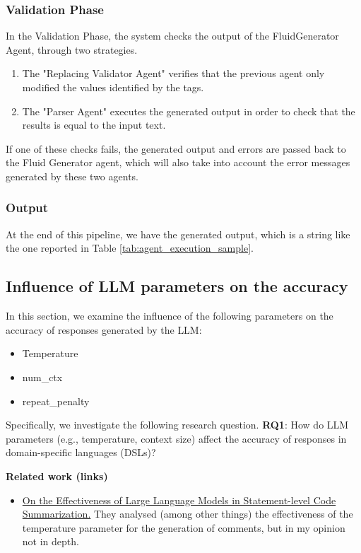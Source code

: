 \subsubsection{Validation Phase}
In the Validation Phase, the system checks the output of the FluidGenerator Agent, through two strategies.
\begin{enumerate}
    \item The "Replacing Validator Agent" verifies that the previous agent only modified the values identified by the tags.
    \item The "Parser Agent" executes the generated output in order to check that the results is equal to the input text.
\end{enumerate}

If one of these checks fails, the generated output and errors are passed back to the Fluid Generator agent, which will also take into account the error messages generated by these two agents.

\subsubsection{Output}

At the end of this pipeline, we have the generated output, which is a string like the one reported in Table \ref{tab:agent_execution_sample}.

\subsection{Influence of LLM parameters on the accuracy}
In this section, we examine the influence of the following parameters on the accuracy of responses generated by the LLM:

\begin{itemize}
    \item Temperature
    \item num\_ctx
    \item repeat\_penalty
\end{itemize}

Specifically, we investigate the following research question. \textbf{RQ1}: How do LLM parameters (e.g., temperature, context size) affect the accuracy of responses in domain-specific languages (DSLs)?

\textbf{Related work (links)}
\begin{itemize}
    \item \href{https://ieeexplore.ieee.org/document/10684656}{On the Effectiveness of Large Language Models in Statement-level Code Summarization.} They analysed (among other things) the effectiveness of the temperature parameter for the generation of comments, but in my opinion not in depth.
\end{itemize}


